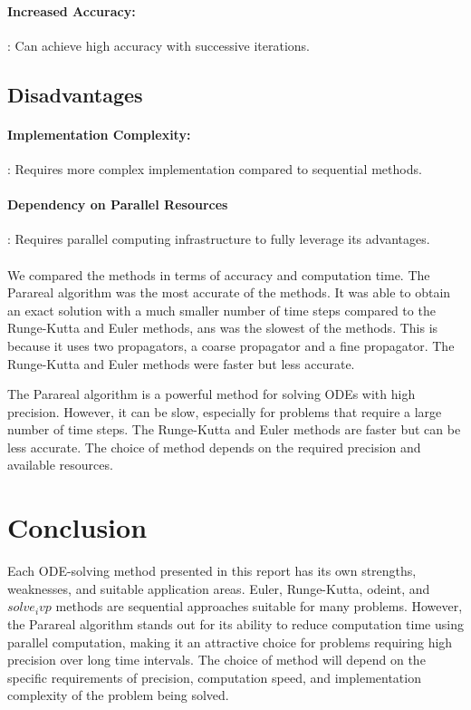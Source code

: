 \documentclass{article}
\begin{document}
\paragraph{Increased Accuracy:}: Can achieve high accuracy with successive iterations.

\subsection{Disadvantages}
\paragraph{Implementation Complexity:}
: Requires more complex implementation compared to sequential methods.

\paragraph{Dependency on Parallel Resources} : Requires parallel computing infrastructure to fully leverage its advantages.


\paragraph*{} We compared the  methods in terms of accuracy and computation time.                                     
The Parareal algorithm was the most accurate of the methods. It was able to obtain an exact solution with a much smaller number of time steps compared to the Runge-Kutta and Euler methods, ans  was the slowest of the methods. This is because it uses two propagators, a coarse propagator and a fine propagator. The Runge-Kutta and Euler methods were faster but less accurate.

The Parareal algorithm is a powerful method for solving ODEs with high precision. However, it can be slow, especially for problems that require a large number of time steps. The Runge-Kutta and Euler methods are faster but can be less accurate. The choice of method depends on the required precision and available resources.




\section{Conclusion}
Each ODE-solving method presented in this report has its own strengths, weaknesses, and suitable application areas. Euler, Runge-Kutta, odeint, and $solve_ivp$ methods are sequential approaches suitable for many problems. However, the Parareal algorithm stands out for its ability to reduce computation time using parallel computation, making it an attractive choice for problems requiring high precision over long time intervals. The choice of method will depend on the specific requirements of precision, computation speed, and implementation complexity of the problem being solved.


\end{document}
